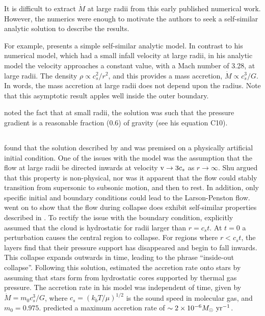 \documentclass[../dissertation.tex]{subfiles}
\begin{document}
It is difficult to extract $\dot M$ at large radii from this early published numerical work.
However, the numerics were enough to motivate the authors to seek a self-similar analytic solution to describe the results.

For example, \citet{1969MNRAS.145..271L} presents a simple self-similar analytic model. In contrast to his numerical model, which had a small infall velocity at large radii, in his analytic model  the velocity approaches a constant value, with a Mach number of 3.28, at large radii.
The density $\rho \propto c_s^2 / r^2$, and this provides a mass accretion, $\dot{M} \propto c_s^3 / G$. In words, the mass accretion at large radii does not depend upon the radius. 
Note that this asymptotic result apples well inside the outer boundary.

\citet{1969MNRAS.145..271L} noted the fact that at small radii, the solution was such that the pressure gradient is a reasonable fraction (0.6) of gravity (see his equation C10). 


\subsection{\citet{1977ApJ...214..488S}} \label{subsec:Shu_review}
\citet{1977ApJ...214..488S} found that the solution described by \citet{1969MNRAS.145..271L} and \citet{1969MNRAS.144..425P} was premised on a physically artificial initial condition.
One of the issues with the model was the assumption that the flow at large radii be directed inwards at velocity ${\rm v} \rightarrow 3c_s$ as $r \rightarrow \infty$. 
Shu argued that this property is non-physical, nor was it apparent that the flow could stably transition from supersonic to subsonic motion, and then to rest. 
In addition, only specific initial and boundary conditions could lead to the Larson-Penston flow.
\citet{1977ApJ...214..488S} went on to show that the flow during collapse does exhibit self-similar properties described in \citet{1969MNRAS.145..271L}.
To rectify the issue with the boundary condition, \citet{1977ApJ...214..488S} explicitly assumed that the cloud is hydrostatic for radii larger than $r = c_s t$. 
At $t=0$ a perturbation causes the central region to collapse. 
For regions where $r < c_s t$, the layers find that their pressure support has disappeared and begin to fall inwards. 
This collapse expands outwards in time, leading to the phrase ``inside-out collapse''. 
Following this solution, \citet{1977ApJ...214..488S} estimated the accretion rate onto 
stars by assuming that stars form from hydrostatic cores supported by thermal gas pressure. 
The accretion rate in his model was independent of time, given by $\dot{M} = m_0c_s^3/G$, where $c_s = (k_b T / \mu)^{1/2}$  is the sound
speed in molecular gas, and $m_0 = 0.975$. 
\citet{1977ApJ...214..488S} predicted a maximum accretion rate of $\sim 2\times10^{-6} M_\odot\,\,\rm yr^{-1}$.
\end{document}
